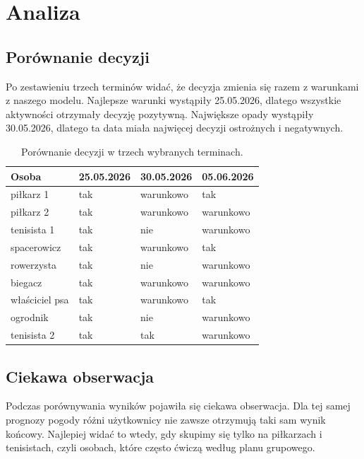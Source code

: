 \documentclass[a4paper,12pt]{article}
\begin{document}
\section{Analiza}

\subsection{Porównanie decyzji}

Po zestawieniu trzech terminów widać, że decyzja zmienia się razem z warunkami z
naszego modelu. Najlepsze warunki wystąpiły 25.05.2026, dlatego wszystkie
aktywności otrzymały decyzję pozytywną. Największe opady wystąpiły
30.05.2026, dlatego ta data miała najwięcej decyzji ostrożnych i negatywnych.

\begin{table}[H]
\centering
\small
\begin{tabular}{p{3.0cm}p{3.0cm}p{3.0cm}p{3.0cm}}
\toprule
\textbf{Osoba} & \textbf{25.05.2026} & \textbf{30.05.2026} & \textbf{05.06.2026} \\
\midrule
piłkarz 1 & tak & warunkowo & tak \\
piłkarz 2 & tak & warunkowo & warunkowo \\
tenisista 1 & tak & nie & warunkowo \\
spacerowicz & tak & warunkowo & tak \\
rowerzysta & tak & nie & warunkowo \\
biegacz & tak & warunkowo & warunkowo \\
właściciel psa & tak & warunkowo & tak \\
ogrodnik & tak & nie & warunkowo \\
tenisista 2 & tak & tak & warunkowo \\
\bottomrule
\end{tabular}
\caption{Porównanie decyzji w trzech wybranych terminach.}
\end{table}

\newpage 
\subsection{Ciekawa obserwacja}

Podczas porównywania wyników pojawiła się ciekawa obserwacja. Dla tej samej
prognozy pogody różni użytkownicy nie zawsze otrzymują taki sam wynik końcowy.
Najlepiej widać to wtedy, gdy skupimy się tylko na piłkarzach i tenisistach,
czyli osobach, które często ćwiczą według planu grupowego.
\end{document}
